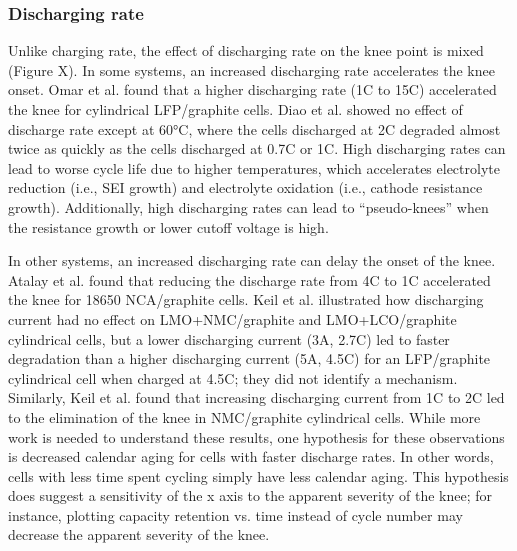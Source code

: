 \documentclass{article}
\begin{document}
\subsubsection{Discharging rate}

Unlike charging rate, the effect of discharging rate on the knee point is mixed (Figure X).
In some systems, an increased discharging rate
accelerates the knee onset.
Omar et al.\cite{omar_lithium_2014} found that a higher discharging rate (1C to 15C) accelerated the knee for cylindrical LFP/graphite cells.
Diao et al.\cite{diao_accelerated_2019} showed no effect of discharge rate except at 60°C, where the cells discharged at 2C degraded almost twice as quickly as the cells discharged at 0.7C or 1C.
High discharging rates can lead to worse cycle life due to higher temperatures, which accelerates electrolyte reduction (i.e., SEI growth) and electrolyte oxidation (i.e., cathode resistance growth). Additionally, high discharging rates can lead to ``pseudo-knees'' when the resistance growth or lower cutoff voltage is high.

In other systems, an increased discharging rate can delay the onset of the knee.
Atalay et al.\cite{atalay_theory_2020} found that reducing the discharge rate from 4C to 1C accelerated the knee for 18650 NCA/graphite cells.
Keil et al.\cite{keil_charging_2016} illustrated how discharging current had no effect on LMO+NMC/graphite and LMO+LCO/graphite cylindrical cells, but a lower discharging current (3A, 2.7C) led to faster degradation than a higher discharging current (5A, 4.5C) for an LFP/graphite cylindrical cell when charged at 4.5C; they did not identify a mechanism. 
Similarly, Keil et al.\cite{keil_linear_2019} found that increasing discharging current from 1C to 2C led to the elimination of the knee in NMC/graphite cylindrical cells.
While more work is needed to understand these results, one hypothesis for these observations is decreased calendar aging for cells with faster discharge rates.
In other words, cells with less time spent cycling simply have less calendar aging. This hypothesis does suggest a sensitivity of the x axis to the apparent severity of the knee; for instance, plotting capacity retention vs. time instead of cycle number may decrease the apparent severity of the knee.
\end{document}
